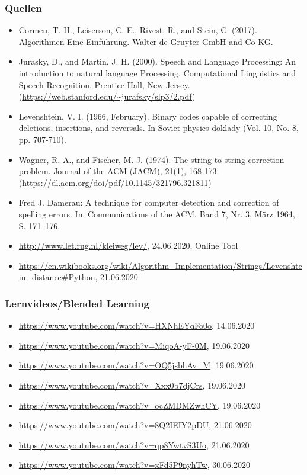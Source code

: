 \documentclass[aspectratio=169]{beamer}
\begin{document}
\begin{frame}\frametitle{Quellen}
\begin{itemize}
    \item Cormen, T. H., Leiserson, C. E., Rivest, R., and Stein, C. (2017). Algorithmen-Eine Einführung. Walter de Gruyter GmbH and Co KG.
    \item Jurasky, D., and Martin, J. H. (2000). Speech and Language Processing: An introduction to natural language Processing. Computational Linguistics and Speech Recognition. Prentice Hall, New Jersey. (\url{https://web.stanford.edu/~jurafsky/slp3/2.pdf})
    \item Levenshtein, V. I. (1966, February). Binary codes capable of correcting deletions, insertions, and reversals. In Soviet physics doklady (Vol. 10, No. 8, pp. 707-710).
    \item Wagner, R. A., and Fischer, M. J. (1974). The string-to-string correction problem. Journal of the ACM (JACM), 21(1), 168-173. (\url{https://dl.acm.org/doi/pdf/10.1145/321796.321811})
    \item Fred J. Damerau: A technique for computer detection and correction of spelling errors. In: Communications of the ACM. Band 7, Nr. 3, März 1964, S. 171–176.
    \item \url{http://www.let.rug.nl/kleiweg/lev/}, 24.06.2020, Online Tool
    \item \url{https://en.wikibooks.org/wiki/Algorithm_Implementation/Strings/Levenshtein_distance\#Python}, 21.06.2020 
\end{itemize}
\end{frame}

\begin{frame}\frametitle{Lernvideos/Blended Learning}
\begin{itemize}
    \item \url{https://www.youtube.com/watch?v=HXNhEYqFo0o}, 14.06.2020
    \item \url{https://www.youtube.com/watch?v=MiqoA-yF-0M}, 19.06.2020 
    \item \url{https://www.youtube.com/watch?v=OQ5jsbhAv_M}, 19.06.2020
    \item \url{https://www.youtube.com/watch?v=Xxx0b7djCrs}, 19.06.2020
    \item \url{https://www.youtube.com/watch?v=ocZMDMZwhCY}, 19.06.2020
    \item \url{https://www.youtube.com/watch?v=8Q2IEIY2pDU}, 21.06.2020
    \item \url{https://www.youtube.com/watch?v=qp8YwtvS3Uo}, 21.06.2020
    \item \url{https://www.youtube.com/watch?v=xFd5P9nyhTw}, 30.06.2020
\end{itemize}
\end{frame}
\end{document}
